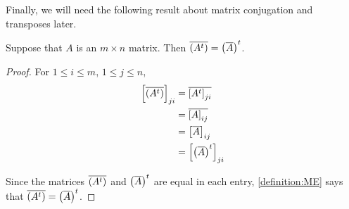 \documentclass{ximera}
\begin{document}
Finally, we will need the following result about matrix conjugation and transposes later.

\begin{theorem}
  \label{theorem:MCT}

  Suppose that $A$ is an $m\times n$ matrix.  Then
  $\overline{\left(A^{t}\right)}=\left(\overline{A}\right)^{t}$.

  \begin{proof}
    For $1\leq i\leq m$, $1\leq j\leq n$,
    \begin{align*}
      \matrixentry{\conjugate{\left(\transpose{A}\right)}}{ji}
      &=\conjugate{\matrixentry{\transpose{A}}{ji}}
      \\ %
      &=\conjugate{\matrixentry{A}{ij}}
      \\ %
      &=\matrixentry{\conjugate{A}}{ij}
      \\ %
      &=\matrixentry{\transpose{\left(\conjugate{A}\right)}}{ji}
      \\ %
    \end{align*}

    Since the matrices $\overline{\left(A^{t}\right)}$ and
    $\left(\overline{A}\right)^{t}$ are equal in each entry,
    \ref{definition:ME} says that
    $\overline{\left(A^{t}\right)}=\left(\overline{A}\right)^{t}$.

\end{proof}
\end{theorem}
\end{document}
